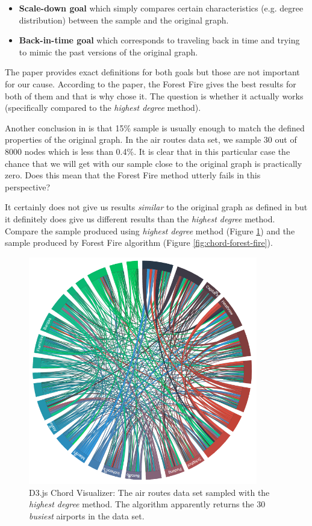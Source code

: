 \begin{itemize}
\item \textbf{Scale-down goal} which simply compares certain characteristics (e.g. degree distribution) between the sample and the original graph.
\item \textbf{Back-in-time goal} which corresponds to traveling back in time and trying to mimic the past versions of the original graph.
\end{itemize}

The paper provides exact definitions for both goals but those are not important for our cause. According to the paper, the Forest Fire gives the best results for both of  them and that is why chose it. The question is whether it actually works (specifically compared to the \emph{highest degree} method).

Another conclusion in \cite{leskovec2006sampling} is that 15\% sample is usually enough to match the defined properties of the original graph. In the air routes data set, we sample 30 out of 8000 nodes which is less than 0.4\%. It is clear that in this particular case the chance that we will get with our sample close to the original graph is practically zero. Does this mean that the Forest Fire method utterly fails in this perspective?

It certainly does not give us results \emph{similar} to the original graph as defined in \cite{leskovec2006sampling} but it definitely does give us different results than the \emph{highest degree} method. Compare the sample produced using \emph{highest degree} method (Figure \ref{fig:chord-highest-degree}) and the sample produced by Forest Fire algorithm (Figure \ref{fig:chord-forest-fire}).

\begin{figure}
	\centering
	\includegraphics[width=100mm]{img/07_chord_highest_degree}
	\caption{D3.js Chord Visualizer: The air routes data set sampled with the \emph{highest degree} method. The algorithm apparently returns the 30 \emph{busiest} airports in the data set.}
    \label{fig:chord-highest-degree}
\end{figure}

